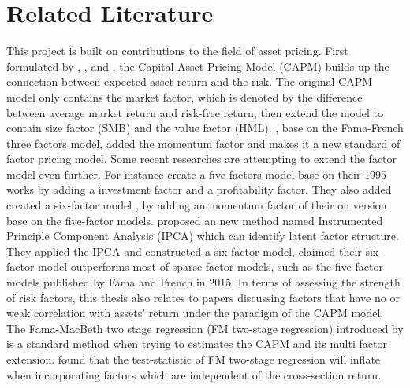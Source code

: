 	\section{Related Literature}\label{Literature}
This project is built on contributions to the field of asset pricing.
First formulated by , , and , the Capital Asset Pricing Model (CAPM) builds up the connection between expected asset return and the risk.
The original CAPM model only contains the market factor, which is denoted by the difference between average market return and risk-free return, then extend the model to contain size factor (SMB) and the value factor (HML).
, base on the Fama-French three factors model, added the momentum factor and makes it a new standard of factor pricing model.
Some recent researches are attempting to extend the factor model even further.
For instance  create a five factors model base on their 1995 works by adding a investment factor and a profitability factor.
They also added created a six-factor model \cite{Fama2018}, by adding an momentum factor of their on version base on the five-factor models.
 proposed an new method named Instrumented Principle Component Analysis (IPCA) which can identify latent factor structure.
They applied the IPCA and constructed a six-factor model, claimed their six-factor model outperforms most of sparse factor models, such as the five-factor models published by Fama and French in 2015.
In terms of assessing the strength of risk factors, this thesis also relates to papers discussing factors that have no or weak correlation with assets' return under the paradigm of the CAPM model.
The Fama-MacBeth two stage regression (FM two-stage regression) introduced by  is a standard method when trying to estimates the CAPM and its multi factor extension. 
 found that the test-statistic of FM two-stage regression will inflate when incorporating factors which are independent of the cross-section return.
